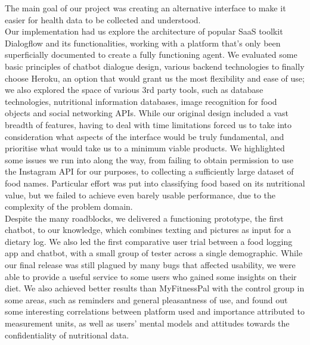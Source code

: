 The main goal of our project was creating an alternative interface to make it easier for health data to be collected and understood. \\
Our implementation had us explore the architecture of popular SaaS toolkit Dialogflow and its functionalities, working with a platform that's only been superficially documented to create a fully functioning agent. We evaluated some basic principles of chatbot dialogue design, various backend technologies to finally choose Heroku, an option that would grant us the most flexibility and ease of use; we also explored the space of various 3rd party tools, such as database technologies, nutritional information databases, image recognition for food objects and social networking APIs. While our original design included a vast breadth of features, having to deal with time limitations forced us to take into consideration what aspects of the interface would be truly fundamental, and prioritise what would take us to a minimum viable products. We highlighted some issues we run into along the way, from failing to obtain permission to use the Instagram API for our purposes, to collecting a sufficiently large dataset of food names. Particular effort was put into classifying food based on its nutritional value, but we failed to achieve even barely usable performance, due to the complexity of the problem domain.\\
Despite the many roadblocks, we delivered a functioning prototype, the first chatbot, to our knowledge, which combines texting and pictures as input for a dietary log. We also led the first comparative user trial between a food logging app and chatbot, with a small group of tester across a single demographic. While our final release was still plagued by many bugs that affected usability, we were able to provide a useful service to some users who gained some insights on their diet. We also achieved better results than MyFitnessPal with the control group in some areas, such as reminders and general pleasantness of use, and found out some interesting correlations between platform used and importance attributed to measurement units, as well as users' mental models and attitudes towards the confidentiality of nutritional data. \\
